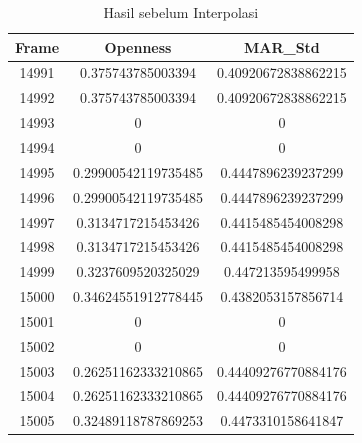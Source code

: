 \begin{longtable}{|c|c|c|}
  \caption{Hasil sebelum Interpolasi}
  \label{tb:InterpolasiHasil}                                   \\
  \hline
  \rowcolor[HTML]{C0C0C0}
  \textbf{Frame} & \textbf{Openness} & \textbf{MAR\_Std} \\
  \hline
  14991 & 0.375743785003394 & 0.40920672838862215 \\
  14992 & 0.375743785003394 & 0.40920672838862215 \\
  14993 & 0 & 0 \\
  14994 & 0 & 0 \\
  14995 & 0.29900542119735485 & 0.4447896239237299 \\
  14996 & 0.29900542119735485 & 0.4447896239237299 \\
  14997 & 0.3134717215453426 & 0.4415485454008298 \\
  14998 & 0.3134717215453426 & 0.4415485454008298 \\
  14999 & 0.3237609520325029 & 0.447213595499958 \\
  15000 & 0.34624551912778445 & 0.4382053157856714 \\
  15001 & 0 & 0 \\
  15002 & 0 & 0 \\
  15003 & 0.26251162333210865 & 0.44409276770884176 \\
  15004 & 0.26251162333210865 & 0.44409276770884176 \\
  15005 & 0.32489118787869253 & 0.4473310158641847 \\
  \hline
\end{longtable}

